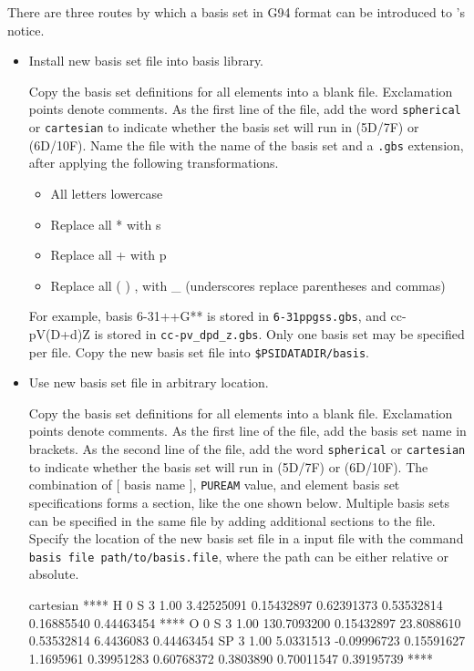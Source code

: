 There are three routes by which a basis set in G94 format can be introduced to \PSIfour's notice.

\begin{itemize}

\item Install new basis set file into \PSIfour basis library.

Copy the basis set definitions for all elements into a blank file. Exclamation points denote comments.
As the first line of the file, add the word \texttt{spherical} or \texttt{cartesian} to indicate
whether the basis set will run in (5D/7F) or (6D/10F).
Name the file with the name of the basis set and a \texttt{.gbs} extension, after applying the following transformations.
\begin{itemize}
\item[] All letters lowercase
\item[] Replace all * with s
\item[] Replace all + with p
\item[] Replace all ( ) , with \_ \quad (underscores replace parentheses and commas)
\end{itemize}
For example, basis 6-31++G** is stored in \texttt{6-31ppgss.gbs}, and cc-pV(D+d)Z is stored in \texttt{cc-pv\_dpd\_z.gbs}.
Only one basis set may be specified per file.
Copy the new basis set file into \texttt{\$PSIDATADIR/basis}.

\item Use new basis set file in arbitrary location.

Copy the basis set definitions for all elements into a blank file. Exclamation points denote comments.
As the first line of the file, add the basis set name in brackets.
As the second line of the file, add the word \texttt{spherical} or \texttt{cartesian} to indicate
whether the basis set will run in (5D/7F) or (6D/10F). 
The combination of [ basis name ], \texttt{PUREAM} value, and element basis set specifications 
forms a section, like the one shown below.
Multiple basis sets can be specified in the same file by adding additional sections to the file.
Specify the location of the new basis set file in a \PSIfour input file with the command 
\texttt{basis file path/to/basis.file}, where the path can be either relative or absolute.
\begin{Snippet}
[ sto-3g ]
cartesian
****
H     0 
S   3   1.00
      3.42525091             0.15432897       
      0.62391373             0.53532814       
      0.16885540             0.44463454       
****
O     0 
S   3   1.00
    130.7093200              0.15432897       
     23.8088610              0.53532814       
      6.4436083              0.44463454       
SP   3   1.00
      5.0331513             -0.09996723             0.15591627       
      1.1695961              0.39951283             0.60768372       
      0.3803890              0.70011547             0.39195739       
****
\end{Snippet}


\end{itemize}
